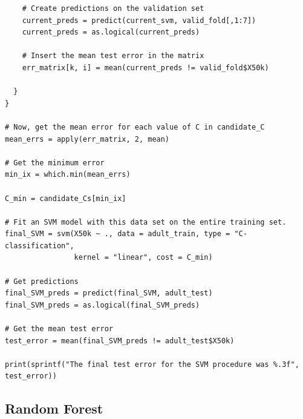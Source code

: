 \documentclass{article}
\begin{document}
\begin{verbatim}
    # Create predictions on the validation set
    current_preds = predict(current_svm, valid_fold[,1:7])
    current_preds = as.logical(current_preds)
    
    # Insert the mean test error in the matrix 
    err_matrix[k, i] = mean(current_preds != valid_fold$X50k)
    
  }
}

# Now, get the mean error for each value of C in candidate_C
mean_errs = apply(err_matrix, 2, mean)

# Get the minimum error
min_ix = which.min(mean_errs)

C_min = candidate_Cs[min_ix]

# Fit an SVM model with this data set on the entire training set. 
final_SVM = svm(X50k ~ ., data = adult_train, type = "C-classification",
                kernel = "linear", cost = C_min)

# Get predictions 
final_SVM_preds = predict(final_SVM, adult_test)
final_SVM_preds = as.logical(final_SVM_preds)

# Get the mean test error 
test_error = mean(final_SVM_preds != adult_test$X50k)

print(sprintf("The final test error for the SVM procedure was %.3f", test_error))

\end{verbatim}

\subsection{Random Forest} \label{sec:randForCode}
\end{document}
